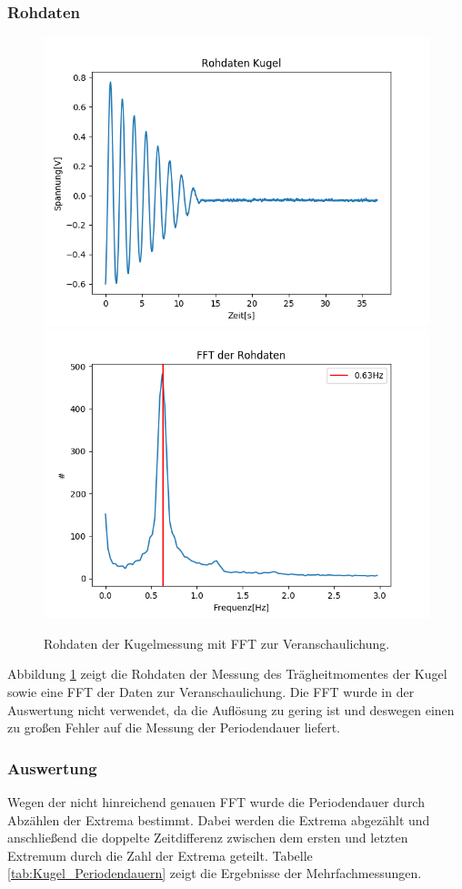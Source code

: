 \documentclass[12pt,a4paper]{article}
\begin{document}
\subsubsection{Rohdaten}
\begin{figure}
\includegraphics[width=0.49\linewidth]{Bilder/Kugel_Rohdaten.PNG}
\includegraphics[width=0.49\linewidth]{Bilder/Kugel_FFT.PNG}
\caption{Rohdaten der Kugelmessung mit FFT zur Veranschaulichung.}
\label{fig:Kugel_Rohdaten}
\end{figure}
Abbildung \ref{fig:Kugel_Rohdaten} zeigt die Rohdaten der Messung des Trägheitmomentes der Kugel sowie eine FFT der Daten zur Veranschaulichung. Die FFT wurde in der Auswertung nicht verwendet, da die Auflösung zu gering ist und deswegen einen zu großen Fehler auf die Messung der Periodendauer liefert.

\subsubsection{Auswertung}
Wegen der nicht hinreichend genauen FFT wurde die Periodendauer durch Abzählen der Extrema bestimmt. Dabei werden die Extrema abgezählt und anschließend die doppelte Zeitdifferenz zwischen dem ersten und letzten Extremum durch die Zahl der Extrema geteilt. Tabelle \ref{tab:Kugel_Periodendauern} zeigt die Ergebnisse der Mehrfachmessungen.
\end{document}

